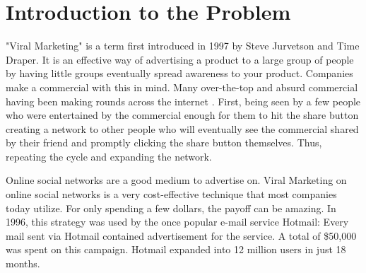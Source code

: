 


\section{Introduction to the Problem}"Viral Marketing" is a term first introduced in 1997 by Steve Jurvetson and Time Draper\cite{viralmarketing}. It is an effective way of advertising a product to a large group of people by having little groups eventually spread awareness to your product. Companies make a commercial with this in mind. Many over-the-top and absurd commercial having been making rounds across the internet \cite{commercialrise}. First, being seen by a few people who were entertained by the commercial enough for them to hit the share button creating a network to other people who will eventually see the commercial shared by their friend and promptly clicking the share button themselves. Thus, repeating the cycle and expanding the network. 

Online social networks are a good medium to advertise on. Viral Marketing on online social networks is a very cost-effective technique that most companies today utilize. For only spending a few dollars, the payoff can be amazing.\cite{viralmarketing} In 1996, this strategy was used by the once popular e-mail service Hotmail: Every mail sent via Hotmail contained advertisement for the service. A total of \$50,000 was spent on this campaign. Hotmail expanded into 12 million users in just 18 months.\cite{viralmarketing} 

